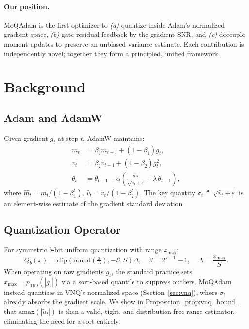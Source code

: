 \documentclass[10pt,twocolumn]{article}
\begin{document}
\paragraph{Our position.}
MoQAdam is the first optimizer to \emph{(a)} quantize inside Adam's
normalized gradient space, \emph{(b)} gate residual feedback by the
gradient SNR, and \emph{(c)} decouple moment updates to preserve an
unbiased variance estimate.  Each contribution is independently
novel; together they form a principled, unified framework.

\section{Background}

\subsection{Adam and AdamW}

Given gradient $g_t$ at step $t$, AdamW \cite{loshchilov2019decoupled}
maintains:
\begin{align}
  m_t &= \beta_1 m_{t-1} + (1-\beta_1) g_t, \\
  v_t &= \beta_2 v_{t-1} + (1-\beta_2) g_t^2, \\
  \theta_t &= \theta_{t-1} - \alpha
    \!\left(\frac{\hat{m}_t}{\sqrt{\hat{v}_t}+\varepsilon}
    + \lambda\,\theta_{t-1}\right),
\end{align}
where $\hat{m}_t = m_t/(1-\beta_1^t)$, $\hat{v}_t = v_t/(1-\beta_2^t)$.
The key quantity $\sigma_t \triangleq \sqrt{\hat{v}_t + \varepsilon}$
is an element-wise estimate of the gradient standard deviation.

\subsection{Quantization Operator}

For symmetric $b$-bit uniform quantization with range $x_{\max}$:
\begin{equation}
  Q_b(x) = \mathrm{clip}\!\left(
    \mathrm{round}\!\left(\tfrac{x}{\Delta}\right),
    -S, S
  \right)\Delta,
  \quad S = 2^{b-1}-1, \quad \Delta = \frac{x_{\max}}{S}.
\end{equation}
When operating on raw gradients $g_t$, the standard practice
\cite{alistarh2017qsgd} sets $x_{\max} = p_{0.99}(|g_t|)$ via a
sort-based quantile to suppress outliers.  MoQAdam instead quantizes
in VNQ's normalized space (Section~\ref{sec:vnq}), where $\sigma_t$
already absorbs the gradient scale.  We show in
Proposition~\ref{prop:vnq_bound} that $\mathrm{amax}(|\tilde{u}_t|)$
is then a valid, tight, and distribution-free range estimator,
eliminating the need for a sort entirely.
\end{document}
